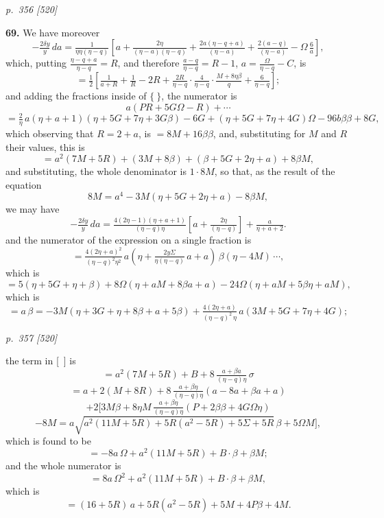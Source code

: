 \documentclass[11pt,a4paper]{article}
\theoremstyle{plain}
\theoremstyle{definition}
\begin{document}
\clearpage

\bigskip
\textit{p.~356 [520]}
\smallskip

\textbf{69.} We have moreover
\[
-\tfrac{2\delta y}{y}\,da = \tfrac{1}{\eta\eta(\eta - q)}\!\left[a + \tfrac{2\eta}{(\eta - a)(\eta - q)} + \tfrac{2a(\eta - q + a)}{(\eta - a)} + \tfrac{2(a - q)}{(\eta - a)} - \Omega\,\tfrac{6}{a}\right],
\]
which, putting $\tfrac{\eta - q + a}{\eta - q} = R$, and therefore $\tfrac{a - q}{\eta - q} = R - 1$, $a = \tfrac{\Omega}{\eta - q} - C$, is
\[
= \tfrac{1}{2}\!\left[\tfrac{1}{a + R} + \tfrac{1}{R} - 2R + \tfrac{2R}{\eta - q}\cdot\tfrac{4}{\eta - q}\cdot\tfrac{M + 8\eta\beta}{q} + \tfrac{6}{\eta - q}\right];
\]
and adding the fractions inside of $\{\ \}$, the numerator is
\[
a(P R + 5G\Omega - R) + \cdots
\]
\[
= \tfrac{2}{\eta}\,a(\eta + a + 1)(\eta + 5G + 7\eta + 3G\beta) - 6G + (\eta + 5G + 7\eta + 4G)\Omega - 96b\beta\beta + 8G,
\]
which observing that $R = 2 + a$, is $= 8M + 16\beta\beta$,
and, substituting for $M$ and $R$ their values, this is
\[
= a^2(7M + 5R) + (3M + 8\beta) + (\beta + 5G + 2\eta + a) + 8\beta M,
\]
and substituting, the whole denominator is $1 \cdot 8M$, so that, as the result of the equation
\[
8M = a^4 - 3M(\eta + 5G + 2\eta + a) - 8\beta M,
\]
we may have
\[
-\tfrac{2\delta y}{y}\,da = \tfrac{4(2\eta - 1)(\eta + a + 1)}{(\eta - q)\eta}\!\left[a + \tfrac{2\eta}{(\eta - q)}\right] + \tfrac{a}{\eta + a + 2}.
\]
and the numerator of the expression on a single fraction is
\[
= \tfrac{4(2\eta + a)^2}{(\eta - q)^2 \eta^2}\,a(\eta + \tfrac{2y\Sigma}{\eta(\eta - q)}\,a + a)\,\beta(\eta - 4M)\,\cdots,
\]
which is
\[
= 5(\eta + 5G + \eta + \beta) + 8\Omega(\eta + a M + 8\beta a + a) - 24\Omega(\eta + a M + 5\beta\eta + a M),
\]
which is
\[
= a\,\beta = -3M(\eta + 3G + \eta + 8\beta + a + 5\beta) + \tfrac{4(2\eta + a)}{(\eta - q)^2\,\eta}\,a(3M + 5G + 7\eta + 4G);
\]

\clearpage

\bigskip
\textit{p.~357 [520]}
\smallskip

the term in [\ ] is
\[
= a^2(7M + 5R) + B + 8\,\tfrac{a + \beta a}{(\eta - q)\eta}\,\sigma
\]
\[
= a + 2(M + 8R) + 8\,\tfrac{a + \beta\eta}{(\eta - q)\eta}\!\left(a - 8a + \beta a + a\right)
\]
\[
+ 2[3M\beta + 8\eta M\,\tfrac{a + \beta\eta}{(\eta - q)\eta}\!\left(P + 2\beta\beta + 4G\Omega\eta\right)
\]
\[
- 8M = a\sqrt{a^2(11M + 5R) + 5R(a^2 - 5R) + 5\Sigma + 5R}\,\beta + 5\Omega M],
\]
which is found to be
\[
= -8a\,\Omega + a^2(11M + 5R) + B\cdot\beta + \beta M;
\]
and the whole numerator is
\[
= 8a\,\Omega^2 + a^2(11M + 5R) + B\cdot\beta + \beta M,
\]
which is
\[
= (16 + 5R)\,a + 5R(a^2 - 5R) + 5M + 4P\beta + 4M.
\]
\end{document}
